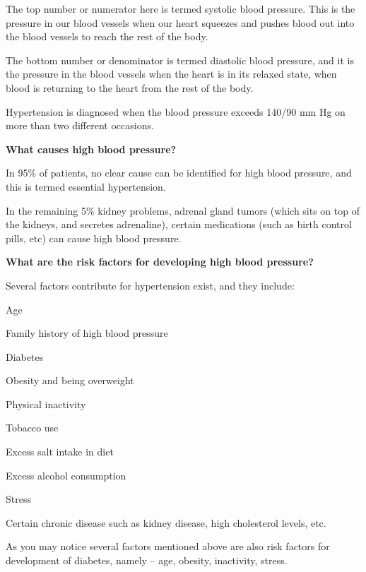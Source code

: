 The top number or numerator here is termed systolic blood pressure. This is the pressure in our blood vessels when our heart squeezes and pushes blood out into the blood vessels to reach the rest of the body.

The bottom number or denominator is termed diastolic blood pressure, and it is the pressure in the blood vessels when the heart is in its relaxed state, when blood is returning to the heart from the rest of the body.

Hypertension is diagnosed when the blood pressure exceeds 140/90 mm Hg on more than two different occasions.

\textbf{What causes high blood pressure?}

In 95\% of patients, no clear cause can be identified for high blood pressure, and this is termed essential hypertension.

In the remaining 5\% kidney problems, adrenal gland tumors (which sits on top of the kidneys, and secretes adrenaline), certain medications (such as birth control pills, etc) can cause high blood pressure.

\textbf{What are the risk factors for developing high blood pressure?}

Several factors contribute for hypertension exist, and they include:

\item Age

 \item Family history of high blood pressure

 \item Diabetes

 \item Obesity and being overweight

 \item Physical inactivity

 \item Tobacco use

 \item Excess salt intake in diet

 \item Excess alcohol consumption

 \item Stress

 \item Certain chronic disease such as kidney disease, high cholesterol levels, etc.

As you may notice several factors mentioned above are also risk factors for development of diabetes, namely – age, obesity, inactivity, stress.

